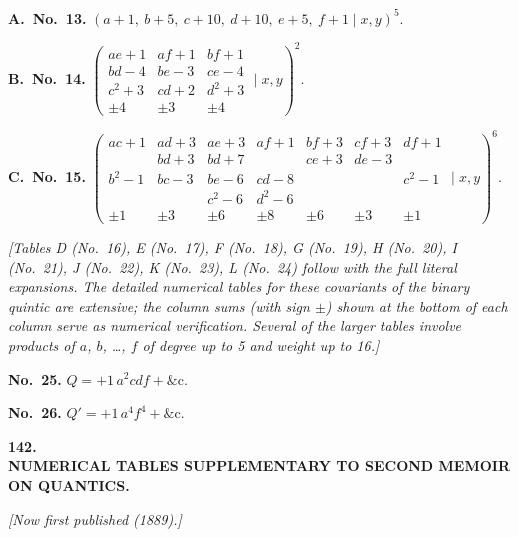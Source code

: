 \documentclass[11pt]{article}
\begin{document}
\textbf{A.~No.~13.} \quad $(a+1,\ b+5,\ c+10,\ d+10,\ e+5,\ f+1 \mid x, y)^5$.

\textbf{B.~No.~14.} \quad
$\left(\begin{array}{ccc} ae + 1 & af + 1 & bf + 1 \\ bd - 4 & be - 3 & ce - 4 \\ c^2 + 3 & cd + 2 & d^2 + 3 \\ \pm 4 & \pm 3 & \pm 4 \end{array} \mid x, y\right)^2$.

\textbf{C.~No.~15.} \quad
$\left(\begin{array}{ccccccc}
ac + 1 & ad + 3 & ae + 3 & af + 1 & bf + 3 & cf + 3 & df + 1 \\
        & bd + 3 & bd + 7 & & ce + 3 & de - 3 & \\
b^2 - 1 & bc - 3 & be - 6 & cd - 8 & & & c^2 - 1 \\
        &        & c^2 - 6 & d^2 - 6 & & & \\
\pm 1 & \pm 3 & \pm 6 & \pm 8 & \pm 6 & \pm 3 & \pm 1
\end{array} \mid x, y\right)^6$.

\textit{[Tables D (No.~16), E (No.~17), F (No.~18), G (No.~19), H (No.~20), I (No.~21), J (No.~22), K (No.~23), L (No.~24) follow with the full literal expansions. The detailed numerical tables for these covariants of the binary quintic are extensive; the column sums (with sign $\pm$) shown at the bottom of each column serve as numerical verification. Several of the larger tables involve products of $a$, $b$, \ldots, $f$ of degree up to 5 and weight up to 16.]}

\textbf{No.~25.} \quad $Q = + 1\,a^2 cdf + \&\text{c.}$ 

\textbf{No.~26.} \quad $Q' = + 1\,a^4 f^4 + \&\text{c.}$


\bigskip\bigskip
\begin{center}
{\Large\bfseries 142.}\\[1ex]
{\large\bfseries NUMERICAL TABLES SUPPLEMENTARY TO SECOND MEMOIR ON QUANTICS.}
\end{center}

\noindent\textit{[Now first published (1889).]}

\medskip
\end{document}
